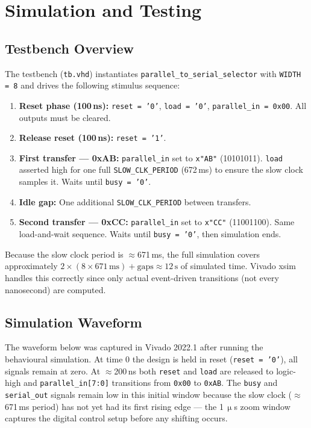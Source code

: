 \documentclass[12pt,a4paper]{report}
\begin{document}
\chapter{Simulation and Testing}

\section{Testbench Overview}

The testbench (\texttt{tb.vhd}) instantiates \texttt{parallel\_to\_serial\_selector} with \texttt{WIDTH = 8} and drives the following stimulus sequence:

\begin{enumerate}[leftmargin=1.5em]
  \item \textbf{Reset phase (100\,ns):} \texttt{reset = '0'}, \texttt{load = '0'}, \texttt{parallel\_in = 0x00}. All outputs must be cleared.
  \item \textbf{Release reset (100\,ns):} \texttt{reset = '1'}.
  \item \textbf{First transfer --- 0xAB:} \texttt{parallel\_in} set to \texttt{x"AB"} (10101011). \texttt{load} asserted high for one full \texttt{SLOW\_CLK\_PERIOD} (672\,ms) to ensure the slow clock samples it. Waits until \texttt{busy = '0'}.
  \item \textbf{Idle gap:} One additional \texttt{SLOW\_CLK\_PERIOD} between transfers.
  \item \textbf{Second transfer --- 0xCC:} \texttt{parallel\_in} set to \texttt{x"CC"} (11001100). Same load-and-wait sequence. Waits until \texttt{busy = '0'}, then simulation ends.
\end{enumerate}

Because the slow clock period is $\approx$671\,ms, the full simulation covers approximately $2 \times (8 \times 671\,\text{ms}) + \text{gaps} \approx 12\,\text{s}$ of simulated time. Vivado xsim handles this correctly since only actual event-driven transitions (not every nanosecond) are computed.

\section{Simulation Waveform}

The waveform below was captured in Vivado 2022.1 after running the behavioural simulation. At time 0 the design is held in reset (\texttt{reset = '0'}), all signals remain at zero. At $\approx$200\,ns both \texttt{reset} and \texttt{load} are released to logic-high and \texttt{parallel\_in[7:0]} transitions from \texttt{0x00} to \texttt{0xAB}. The \texttt{busy} and \texttt{serial\_out} signals remain low in this initial window because the slow clock ($\approx$671\,ms period) has not yet had its first rising edge --- the 1\,$\upmu$s zoom window captures the digital control setup before any shifting occurs.
\end{document}
